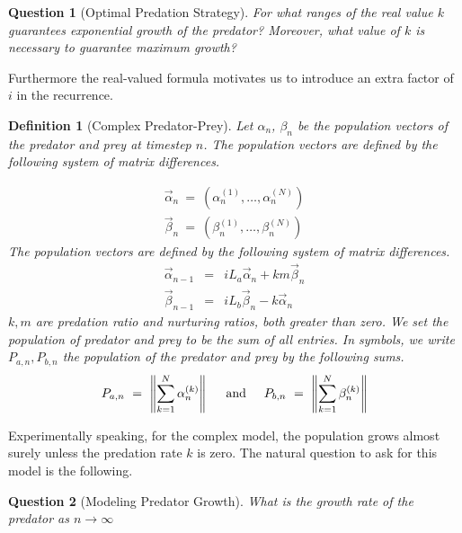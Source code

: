 \documentclass{article}
\newcommand{\textAnd}{
    {
        \hspace{5mm}
        \textrm{and}
        \hspace{5mm}
    }
}
\newtheorem{definition}{Definition}[section]
\newtheorem{question}{Question}[section]
\newtheorem{definition}{Definition}
\newtheorem{question}{Question}
\numberwithin{equation}{section}
\begin{document}
\begin{question}[Optimal Predation Strategy]
For what ranges of the real value $k$ guarantees exponential growth 
of the predator? Moreover, what value of $k$ is necessary to guarantee 
maximum growth?
\end{question}

Furthermore the real-valued formula motivates us to introduce an 
extra factor of $i$ in the recurrence.  

\begin{definition}[Complex Predator-Prey]
Let $\alpha_n$, $\beta_n$ be the population vectors 
of the predator and prey at timestep $n$. The population 
vectors are defined by the following 
system of matrix differences. 


\begin{eqnarray}
    \vec \alpha_n \ = \ (\alpha_n^{(1)}, \dots, \alpha_n^{(N)}) 
    \nonumber \\
    \vec \beta_n \ = \ (\beta_n^{(1)}, \dots, \beta_n^{(N)}) 
\end{eqnarray}
 The population 
vectors are defined by the following 
system of matrix differences. 
\begin{eqnarray}
    \vec \alpha_{n - 1} &=& iL_a \vec \alpha_n + k m \vec \beta_n \nonumber \\ 
    \vec \beta_{n - 1} &=& iL_b \vec \beta_n - k \vec \alpha_n
\end{eqnarray}
$k, m$ are predation ratio and nurturing ratios, both greater than zero. 
We set the population of predator and prey to be the sum 
of all entries. In symbols, we write $P_{a, n}, P_{b, n}$ the population 
of the predator and prey by the following sums. 
\begin{equation}
    P_{a, n} \ = \ \left\|\sum_{k = 1}^{N} \alpha^{(k)}_{n} \right\|
    \textAnd
    P_{b, n} \ = \ \left\|\sum_{k = 1}^{N} \beta^{(k)}_{n} \right\|
\end{equation}
\end{definition}

Experimentally speaking, for the complex model, the population 
grows almost surely unless the predation rate $k$ is zero. The natural 
question to ask for this model is the following. 

\begin{question}[Modeling Predator Growth]
    What is the growth rate of the predator as $n \rightarrow \infty$
\end{question}

\end{document}
